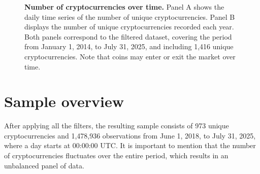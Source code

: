 \documentclass[
  11pt,
  a4paper,
  openany]{scrreprt}
\begin{document}
\begin{figure}[h]


\caption[Number of cryptocurrencies over
time]{\label{fig-numcoins}\textbf{Number of cryptocurrencies over time.}
Panel A shows the daily time series of the number of unique
cryptocurrencies. Panel B displays the number of unique cryptocurrencies
recorded each year. Both panels correspond to the filtered dataset,
covering the period from January 1, 2014, to July 31, 2025, and
including 1,416 unique cryptocurrencies. Note that coins may enter or
exit the market over time.}

\end{figure}%

\section{Sample overview}\label{sample-overview}

After applying all the filters, the resulting sample consists of 973
unique cryptocurrencies and 1,478,936 observations from June 1, 2018, to
July 31, 2025, where a day starts at 00:00:00 UTC. It is important to
mention that the number of cryptocurrencies fluctuates over the entire
period, which results in an unbalanced panel of data.
\end{document}

